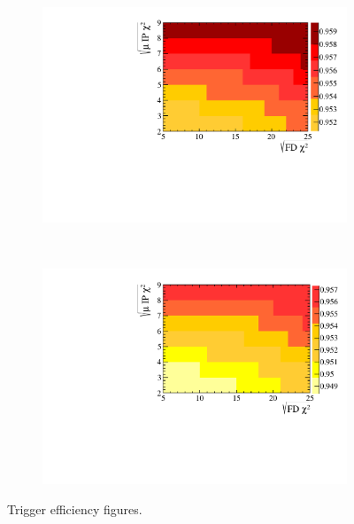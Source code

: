 \begin{figure}
    \centering
    \begin{subfigure}[b]{0.4\textwidth}
        \includegraphics[width=\textwidth]{./Figs/Selection/Dec_trigger_chart.pdf}
        \caption{ }
        \label{fig:Dec}
    \end{subfigure}
    ~ %
    \begin{subfigure}[b]{0.4\textwidth}
        \includegraphics[width=\textwidth]{./Figs/Selection/TIS_TOS_Trigger_chart.pdf}
        \caption{ }
        \label{fig:TISTOS}
    \end{subfigure}
    \caption{Trigger efficiency figures.}
    \label{fig:triggereffplots}
\end{figure}

